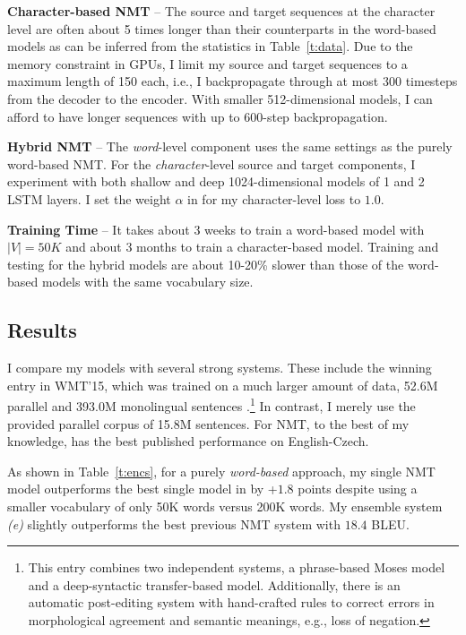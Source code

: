 {\bf Character-based NMT} -- The source and
target sequences at the character level are often about 5 times longer than their counterparts in the
word-based models as can be inferred from the statistics in
Table~\ref{t:data}. Due to the memory constraint in GPUs, I limit my source and
target sequences to a maximum length of 150 each, i.e., I backpropagate
through at most 300 timesteps from the decoder to the encoder. With
smaller 512-dimensional models, I can afford to have longer sequences with up
to 600-step backpropagation. 

{\bf Hybrid NMT} -- The {\it word}-level component uses the
same settings as the purely word-based NMT. For the {\it character}-level source
and target components, I experiment with both shallow and deep 1024-dimensional models of
1 and 2 LSTM layers. 
I
set the weight $\alpha$ in  for my character-level loss to
$1.0$.

{\bf Training Time} -- It takes about 3 weeks to train a word-based model with
$|V|=50K$ and about 3 months to train a character-based model. Training and
testing for the hybrid models are about 10-20\% slower than those of the word-based
models with the same vocabulary size.

\subsection{Results}

I compare my models with several strong systems. These include the
winning entry in WMT'15, which was
trained on a much larger amount of data, 52.6M parallel
 and 393.0M monolingual sentences \cite{bojar15wmt}.\footnote{This
entry combines two independent
systems, a phrase-based Moses model and a deep-syntactic transfer-based model.
Additionally, there is  an automatic
post-editing system with hand-crafted rules to correct errors
in morphological agreement and semantic meanings, e.g., loss of negation.}
In contrast, I merely use the
provided parallel corpus of 15.8M sentences.
For NMT, to the best of my knowledge, \cite{jean15wmt} has
the best published performance on English-Czech.

As shown in Table~\ref{t:encs}, for a purely {\it word-based} approach, 
my single NMT model outperforms the best single model in \cite{jean15wmt} by
+$1.8$ points despite
using a smaller vocabulary of only 50K words versus 200K words. 
My ensemble system {\it (e)} slightly outperforms the best previous NMT system with $18.4$ BLEU.

